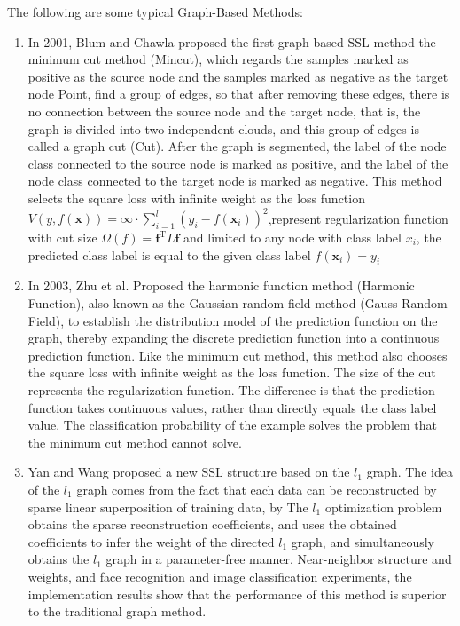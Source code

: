 \documentclass[11pt,en]{elegantpaper}
\begin{document}
\begin{itemize}
\end{itemize}
The following are some typical Graph-Based Methods:
\begin{enumerate}
	\item In 2001, Blum and Chawla proposed the first graph-based SSL method-the minimum cut method (Mincut), which regards the samples marked as positive as the source node and the samples marked as negative as the target node Point, find a group of edges, so that after removing these edges, there is no connection between the source node and the target node, that is, the graph is divided into two independent clouds, and this group of edges is called a graph cut (Cut). After the graph is segmented, the label of the node class connected to the source node is marked as positive, and the label of the node class connected to the target node is marked as negative. This method selects the square loss with infinite weight as the loss function $V(y, f(\boldsymbol{x}))=\infty \cdot \sum_{i=1}^{l}\left(y_{i}-f\left(\boldsymbol{x}_{i}\right)\right)^{2}$,represent regularization function with cut size $\Omega(f)=\boldsymbol{f}^{\mathrm{T}} L \boldsymbol{f}$ and limited to any node with class label $ x_ {i} $, the predicted class label is equal to the given class label $f\left(\boldsymbol{x}_{i}\right)=y_{i}$
	\item In 2003, Zhu et al. Proposed the harmonic function method (Harmonic Function), also known as the Gaussian random field method (Gauss Random Field), to establish the distribution model of the prediction function on the graph, thereby expanding the discrete prediction function into a continuous prediction function. Like the minimum cut method, this method also chooses the square loss with infinite weight as the loss function. The size of the cut represents the regularization function. The difference is that the prediction function takes continuous values, rather than directly equals the class label value. The classification probability of the example solves the problem that the minimum cut method cannot solve.
	\item Yan and Wang proposed a new SSL structure based on the $ l_ {1} $ graph. The idea of the $ l_ {1} $ graph comes from the fact that each data can be reconstructed by sparse linear superposition of training data, by The $ l_ {1} $ optimization problem obtains the sparse reconstruction coefficients, and uses the obtained coefficients to infer the weight of the directed $ l_ {1} $ graph, and simultaneously obtains the $ l_ {1} $ graph in a parameter-free manner. Near-neighbor structure and weights, and face recognition and image classification experiments, the implementation results show that the performance of this method is superior to the traditional graph method.
\end{enumerate}
\end{document}
